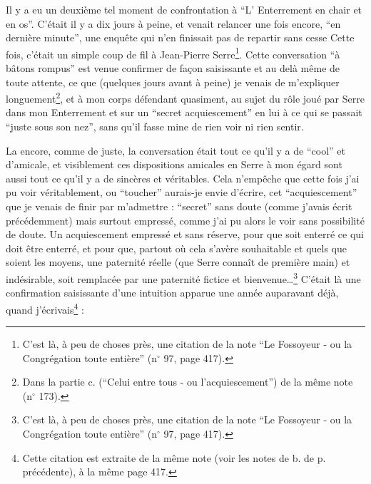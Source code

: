 Il y a eu un deuxième tel moment de confrontation à ``L' Enterrement en chair et en os''. C'était il y a dix jours à peine, et venait relancer une fois encore, ``en dernière minute'', une enquête qui n'en finissait pas de repartir sans cesse Cette fois, c'était un simple coup de fil à Jean-Pierre Serre\footnote{C'est là, à peu de choses près, une citation de la note ``Le Fossoyeur - ou la Congrégation toute entière'' (n$^{\circ}$ 97, page 417).}. Cette conversation ``à bâtons rompus'' est venue confirmer de façon saisissante et au delà même de toute attente, ce que (quelques jours avant à peine) je venais de m'expliquer longuement\footnote{Dans la partie c. (``Celui entre tous - ou l'acquiescement'') de la même note (n$^{\circ}$ 173).}, et à mon corps défendant quasiment, au sujet du rôle joué par Serre dans mon Enterrement et sur un ``secret acquiescement'' en lui à ce qui se passait ``juste sous son nez'', sans qu'il fasse mine de rien voir ni rien sentir.

La encore, comme de juste, la conversation était tout ce qu'il y a de ``cool'' et d'amicale, et visiblement ces dispositions amicales en Serre à mon égard sont aussi tout ce qu'il y a de sincères et véritables. Cela n'empêche que cette fois j'ai pu voir véritablement, ou ``toucher'' aurais-je envie d'écrire, cet ``acquiescement'' que je venais de finir par m'admettre : ``secret'' sans doute (comme j'avais écrit précédemment) mais surtout empressé, comme j'ai pu alors le voir sans possibilité de doute. Un acquiescement empressé et sans réserve, pour que soit enterré ce qui doit être enterré, et pour que, partout où cela s'avère souhaitable et quels que soient les moyens, une paternité réelle (que Serre connaît de première main) et indésirable, soit remplacée par une paternité fictice et bienvenue\ldots\footnote{C'est là, à peu de choses près, une citation de la note ``Le Fossoyeur - ou la Congrégation toute entière'' (n$^{\circ}$ 97, page 417).} C'était là une confirmation saisissante d'une intuition apparue une année auparavant déjà, quand j'écrivais\footnote{Cette citation est extraite de la même note (voir les notes de b. de p. précédente), à la même page 417.} :


